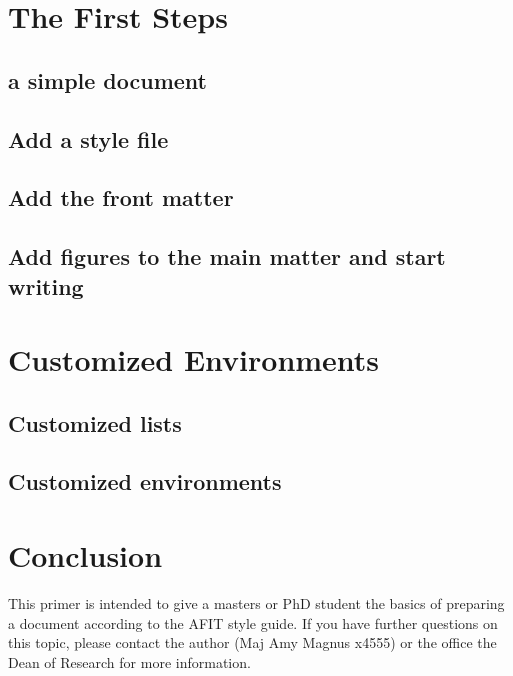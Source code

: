 \documentclass[12pt,letterpaper,oneside]{book}
\begin{document}
\frontmatter
	\flyleaf                        
	\disclaimerpage                 
	\titlepageAFIT                      
	\committeepage  
	
	\tableofcontents
	\listoffigures
	
\mainmatter
	
	\chapter{The First Steps}
		
		
		\section{\Latex a simple document}
		

		\section{Add a style file}
		
		
		\section{Add the front matter}
		
		
		

		\section{Add figures to the main matter and start writing}
		
		
		
		
	\chapter{Customized Environments}
		
		\section{Customized lists}
		\section{Customized environments}
	\chapter{Conclusion}
	         This primer is intended to give a masters or PhD student the basics of preparing a \Latex document according to the AFIT style guide\cite{AFITStyle}.  If you have further questions on this topic, please contact the author (Maj Amy Magnus x4555) or the office the Dean of Research for more information. \cite{dumBook,dumArticle}
	         
\backmatter
	\singlespace
	
	 
	\clearpage
\end{document}
